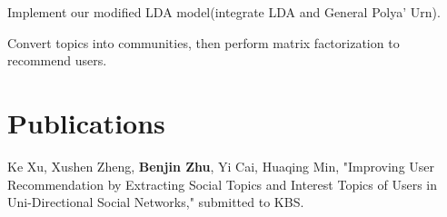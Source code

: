 \documentclass[]{deedy-resume-openfont}
\begin{document}
\begin{minipage}[t]{0.69\textwidth}
\sectionsep %



\begin{tightemize}
\item Implement our modified LDA model(integrate LDA and General Polya' Urn).
\item Convert topics into communities, then perform matrix factorization to recommend users.
\end{tightemize}

\sectionsep %




\section{Publications}
\sectionsep %

\begin{tightemize}
\item Ke Xu, Xushen Zheng, \textbf{Benjin Zhu}, Yi Cai, Huaqing Min, {"Improving User Recommendation by Extracting Social Topics and Interest Topics of Users in Uni-Directional Social Networks,"} submitted to KBS.
\end{tightemize}


\end{minipage}
\end{document}
